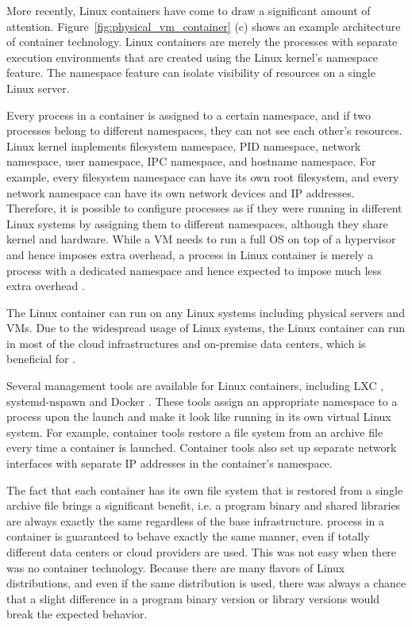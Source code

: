 More recently, Linux containers \cite{menage2007adding} have come to draw a significant amount of attention.
Figure~\ref{fig:physical_vm_container} (c) shows an example architecture of container technology. 
Linux containers are merely the processes with separate execution environments that are created using the Linux kernel's namespace feature.
The namespace feature can isolate visibility of resources on a single Linux server.

Every process in a container is assigned to a certain namespace, and if two processes belong to different namespaces, they can not see each other's resources. 
Linux kernel implements filesystem namespace, PID namespace, network namespace, user namespace, IPC namespace, and hostname namespace. 
For example, every filesystem namespace can have its own root filesystem, and every network namespace can have its own network devices and IP addresses.
Therefore, it is possible to configure processes as if they were running in different Linux systems by assigning them to different namespaces, although they share kernel and hardware.
While a VM needs to run a full OS on top of a hypervisor and hence imposes extra overhead, a process in Linux container is merely a process with a dedicated namespace and hence expected to impose much less extra overhead \cite{felter2015updated}.

The Linux container can run on any Linux systems including physical servers and VMs.
Due to the widespread usage of Linux systems, the Linux container can run in most of the cloud infrastructures and on-premise data centers, which is beneficial for .

Several management tools are available for Linux containers, including LXC \cite{noronha2018performance}, systemd-nspawn \cite{jedge2013} and Docker \cite{merkel2014docker}.
These tools assign an appropriate namespace to a process upon the launch and make it look like running in its own virtual Linux system.
For example, container tools restore a file system from an archive file every time a container is launched. 
Container tools also set up separate network interfaces with separate IP addresses in the container's namespace.

The fact that each container has its own file system that is restored from a single archive file brings a significant benefit, i.e. a program binary and shared libraries are always exactly the same regardless of the base infrastructure.
 process in a container is guaranteed to behave exactly the same manner, even if totally different data centers or cloud providers are used.
This was not easy when there was no container technology.
Because there are many flavors of Linux distributions, and even if the same distribution is used, there was always a chance that a slight difference in a program binary version or library versions would break the expected behavior.

